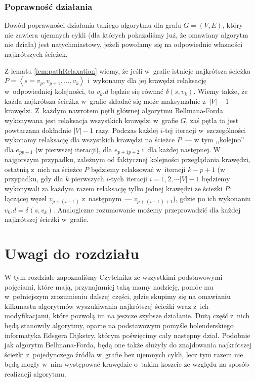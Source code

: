 \subsubsection{Poprawność działania}

Dowód poprawności działania takiego algorytmu dla grafu $G = \left( V, E \right)$, który nie zawiera ujemnych cykli (dla których pokazaliśmy już, że omawiany algorytm nie działa) jest natychmiastowy, jeżeli powołamy się na odpowiednie własności najkrótszych ścieżek.

Z lematu \ref{lem:pathRelaxation} wiemy, że jeśli w~grafie istnieje najkrótsza ścieżka $P = \left \langle s=v_{p}, v_{p+1}, \ldots, v_{k} \right \rangle $ i~wykonamy dla jej krawędzi relaksację w~odpowiedniej kolejności, to $v_{k}.d$ będzie się równać $ \delta \left( s, v_{k} \right)$. Wiemy także, że każda najkrótsza ścieżka w~grafie składać się może maksymalnie z~$ \left| V \right| - 1 $ krawędzi. Z~każdym nawrotem pętli głównej algorytmu Bellmana-Forda wykonywana jest relaksacja wszystkich krawędzi w~grafie $G$, zaś pętla ta jest powtarzana dokładnie $ \left| V \right| - 1 $ razy. Podczas każdej $i$-tej iteracji w~szczególności wykonamy relaksację dla wszystkich krawędzi na ścieżce $P$~--- w tym ,,kolejno'' dla $e_{pp+1}$ (w pierwszej iteracji), dla $e_{p+1p+2}$ i~dla każdej następnej. W najgorszym przypadku, zależnym od faktycznej kolejności przeglądania krawędzi, ostatnią z~nich na ścieżce $P$ będziemy relaksować w~iteracji $k-p+1$ (w przypadku, gdy dla $k$ pierwszych $i$-tych iteracji $i = 1, 2, \cdots \left| V \right| - 1$ będziemy wykonywali za każdym razem relaksację tylko jednej krawędzi ze ścieżki $P$: łączącej węzeł $v_{p+ \left( i-1 \right)}$ z~następnym~--- $v_{p+ \left( i-1 \right) + 1}$), gdzie po ich wykonaniu $v_{k}.d = \delta \left( s, v_{k} \right)$. Analogiczne rozumowanie możemy przeprowadzić dla każdej najkrótszej ścieżki w~grafie.

\section{Uwagi do rozdziału}

W tym rozdziale zapoznaliśmy Czytelnika ze wszystkimi podstawowymi pojęciami, które mają, przynajmniej taką mamy nadzieję, pomóc mu w~pełniejszym zrozumieniu dalszej części, gdzie skupimy się na omawianiu kilkunastu algorytmów wyszukiwania najkrótszej ścieżki wraz z~ich modyfikacjami, które pozwolą im na jeszcze szybsze działanie. Dużą część z~nich będą stanowiły algorytmy, oparte na podstawowym pomyśle holenderskiego informatyka Edsgera Dijkstry, którym poświęcimy cały następny dział. Podobnie jak algorytm Bellmana-Forda, będą one także służyły do znajdowania najkrótszej ścieżki z~pojedynczego źródła w~grafie bez ujemnych cykli, lecz tym razem nie będą mogły w~nim występować krawędzie o~takim koszcie ze względu na sposób realizacji algorytmu.